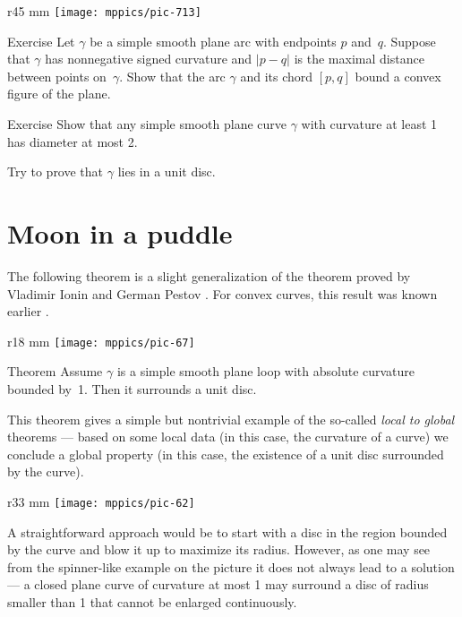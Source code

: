 \begin{wrapfigure}{r}{45 mm}
\vskip-8mm
\centering
\texttt{[image: mppics/pic-713]}
\vskip0mm
\end{wrapfigure}

\begin{thm}{Exercise}\label{ex:convex-lens}
Let $\gamma$ be a simple smooth plane arc with endpoints $p$ and~$q$.
Suppose that $\gamma$ has nonnegative signed curvature and $|p-q|$ is the maximal distance between points on~$\gamma$.
Show that the arc $\gamma$ and its chord $[p,q]$ bound a convex figure of the plane.
\end{thm}

\begin{thm}{Exercise}\label{ex:diameter-of-simple-curve}
Show that any simple smooth plane curve $\gamma$ with curvature at least 1 has diameter at most 2.

Try to prove that $\gamma$ lies in a unit disc.
\end{thm}


\section{Moon in a puddle}

The following theorem is a slight generalization of the theorem proved by Vladimir Ionin and German Pestov \cite{ionin-pestov}.
For convex curves, this result was known earlier \cite[\S 24]{blaschke}.


\begin{wrapfigure}{r}{18 mm}
\vskip-8mm
\centering
\texttt{[image: mppics/pic-67]}
\vskip-2mm
\end{wrapfigure}

\begin{thm}{Theorem}\label{thm:moon-orginal}
Assume $\gamma$ is a simple smooth plane loop with absolute curvature bounded by~1.
Then it surrounds a unit disc.
\end{thm}

This theorem gives a simple but nontrivial example of the so-called \emph{local to global} theorems --- based on some local data (in this case, the curvature of a curve) we conclude a global property (in this case, the existence of a unit disc surrounded by the curve).

{

\begin{wrapfigure}{r}{33 mm}
\vskip-4mm
\centering
\texttt{[image: mppics/pic-62]}
\vskip0mm
\end{wrapfigure}

A straightforward approach would be to start with a disc in the region bounded by the curve and blow it up to maximize its radius.
However, as one may see from the spinner-like example on the picture it does not always lead to a solution --- a closed plane curve of curvature at most 1 may surround a disc of radius smaller than 1 that cannot be enlarged continuously.

}

